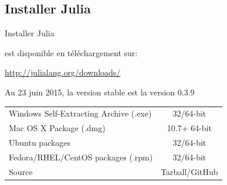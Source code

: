 \subsection{Installer Julia}
\begin{frame}{Installer Julia}
    \par{{\Julia} est disponible en téléchargement sur:
        \begin{center}\href{http://julialang.org/downloads/}{http://julialang.org/downloads/}\end{center}\vspace{2ex}
        Au 23 juin 2015, la version stable est la version 0.3.9}
    \begin{center}
        \begin{tabular}{lc}
            Windows Self-Extracting Archive (.exe) & 32/64-bit\\
            Mac OS X Package (.dmg) & 10.7+ 64-bit\\
            Ubuntu packages & 32/64-bit\\
            Fedora/RHEL/CentOS packages (.rpm) & 32/64-bit\\
            Source & Tarball/GitHub\\
        \end{tabular}
    \end{center}
\end{frame}


